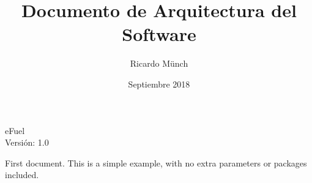 \documentclass{article}
\title{Documento de Arquitectura del Software} \let\Title\@title
\date{Septiembre 2018} \let\Date\@date
\author{Ricardo Münch} \let\Author\@author
\begin{document}
    \begin{titlepage}
    \huge{\Title}
    \begin{flushright}
        \Large{eFuel \\ Versión: 1.0}
    \end{flushright}
    \end{titlepage}

    \newpage
    \tableofcontents

    \newpage
    First document. This is a simple example, with no extra parameters or packages included.
\end{document}
